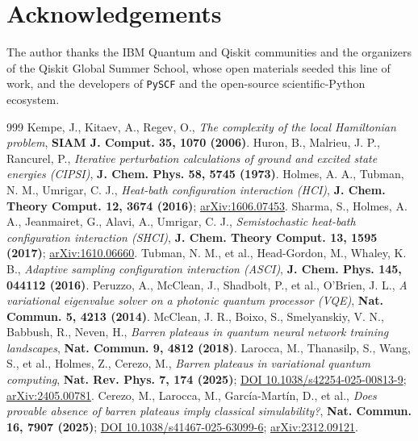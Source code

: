 \documentclass[onecolumn,a4paper]{quantumarticle}
\begin{document}
\section*{Acknowledgements}
\small
The author thanks the IBM Quantum and Qiskit communities and the organizers of the Qiskit Global Summer School,
whose open materials seeded this line of work, and the developers of \texttt{PySCF} and the
open-source scientific-Python ecosystem.


\begingroup
\footnotesize
\frenchspacing
\begin{thebibliography}{999}
\setlength{\itemsep}{0.2pt}\setlength{\parsep}{0pt}
 Kempe, J., Kitaev, A., Regev, O., \emph{The complexity of the local Hamiltonian problem}, \textbf{SIAM J. Comput. 35, 1070 (2006)}.
 Huron, B., Malrieu, J. P., Rancurel, P., \emph{Iterative perturbation calculations of ground and excited state energies (CIPSI)}, \textbf{J. Chem. Phys. 58, 5745 (1973)}.
 Holmes, A. A., Tubman, N. M., Umrigar, C. J., \emph{Heat-bath configuration interaction (HCI)}, \textbf{J. Chem. Theory Comput. 12, 3674 (2016)}; \href{https://arxiv.org/abs/1606.07453}{arXiv:1606.07453}.
 Sharma, S., Holmes, A. A., Jeanmairet, G., Alavi, A., Umrigar, C. J., \emph{Semistochastic heat-bath configuration interaction (SHCI)}, \textbf{J. Chem. Theory Comput. 13, 1595 (2017)}; \href{https://arxiv.org/abs/1610.06660}{arXiv:1610.06660}.
 Tubman, N. M., et al., Head-Gordon, M., Whaley, K. B., \emph{Adaptive sampling configuration interaction (ASCI)}, \textbf{J. Chem. Phys. 145, 044112 (2016)}.
 Peruzzo, A., McClean, J., Shadbolt, P., et al., O'Brien, J. L., \emph{A variational eigenvalue solver on a photonic quantum processor (VQE)}, \textbf{Nat. Commun. 5, 4213 (2014)}.
 McClean, J. R., Boixo, S., Smelyanskiy, V. N., Babbush, R., Neven, H., \emph{Barren plateaus in quantum neural network training landscapes}, \textbf{Nat. Commun. 9, 4812 (2018)}.
 Larocca, M., Thanasilp, S., Wang, S., et al., Holmes, Z., Cerezo, M., \emph{Barren plateaus in variational quantum computing}, \textbf{Nat. Rev. Phys. 7, 174 (2025)}; \href{https://doi.org/10.1038/s42254-025-00813-9}{DOI 10.1038/s42254-025-00813-9}; \href{https://arxiv.org/abs/2405.00781}{arXiv:2405.00781}.
 Cerezo, M., Larocca, M., García-Martín, D., et al., \emph{Does provable absence of barren plateaus imply classical simulability?}, \textbf{Nat. Commun. 16, 7907 (2025)}; \href{https://doi.org/10.1038/s41467-025-63099-6}{DOI 10.1038/s41467-025-63099-6}; \href{https://arxiv.org/abs/2312.09121}{arXiv:2312.09121}.

\end{thebibliography}
\end{document}
